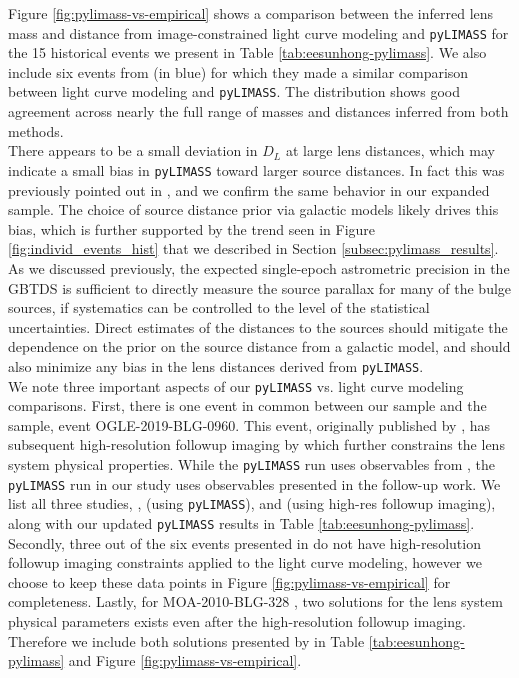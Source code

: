 \documentclass[twocolumn]{aastex631}
\begin{document}
\indent Figure \ref{fig:pylimass-vs-empirical} shows a comparison between the inferred lens mass and distance from image-constrained light curve modeling and \texttt{pyLIMASS} for the 15 historical events we present in Table \ref{tab:eesunhong-pylimass}. We also include six events from \cite{bachelet:2024a} (in blue) for which they made a similar comparison between light curve modeling and \texttt{pyLIMASS}. The distribution shows good agreement across nearly the full range of masses and distances inferred from both methods.\\
\indent There appears to be a small deviation in $D_L$ at large lens distances, which may indicate a small bias in \texttt{pyLIMASS} toward larger source distances. In fact this was previously pointed out in \cite{bachelet:2024a}, and we confirm the same behavior in our expanded sample. The choice of source distance prior via galactic models likely drives this bias, which is further supported by the trend seen in Figure \ref{fig:individ_events_hist} that we described in Section \ref{subsec:pylimass_results}. As we discussed previously, the expected single-epoch astrometric precision in the GBTDS is sufficient to directly measure the source parallax for many of the bulge sources, if systematics can be controlled to the level of the statistical uncertainties. Direct estimates of the distances to the sources should mitigate the dependence on the prior on the source distance from a galactic model, and should also minimize any bias in the lens distances derived from \texttt{pyLIMASS}. \\
\indent We note three important aspects of our \texttt{pyLIMASS} vs. light curve modeling comparisons. First, there is one event in common between our sample and the \cite{bachelet:2024a} sample, event OGLE-2019-BLG-0960. This event, originally published by \cite{yee:2021a}, has subsequent high-resolution followup imaging by \cite{zhang:2025a} which further constrains the lens system physical properties. While the \cite{bachelet:2024a} \texttt{pyLIMASS} run uses observables from \cite{yee:2021a}, the \texttt{pyLIMASS} run in our study uses observables presented in the \cite{zhang:2025a} follow-up work. We list all three studies, \cite{yee:2021a}, \cite{bachelet:2024a} (using \texttt{pyLIMASS}), and \cite{zhang:2025a} (using high-res followup imaging), along with our updated \texttt{pyLIMASS} results in Table \ref{tab:eesunhong-pylimass}. Secondly, three out of the six events presented in \cite{bachelet:2024a} do not have high-resolution followup imaging constraints applied to the light curve modeling, however we choose to keep these data points in Figure \ref{fig:pylimass-vs-empirical} for completeness. Lastly, for MOA-2010-BLG-328 \citep{furusawa:2013a, vandorou:2025b}, two solutions for the lens system physical parameters exists even after the high-resolution followup imaging. Therefore we include both solutions presented by \cite{vandorou:2025b} in Table \ref{tab:eesunhong-pylimass} and Figure \ref{fig:pylimass-vs-empirical}.\\
\end{document}
